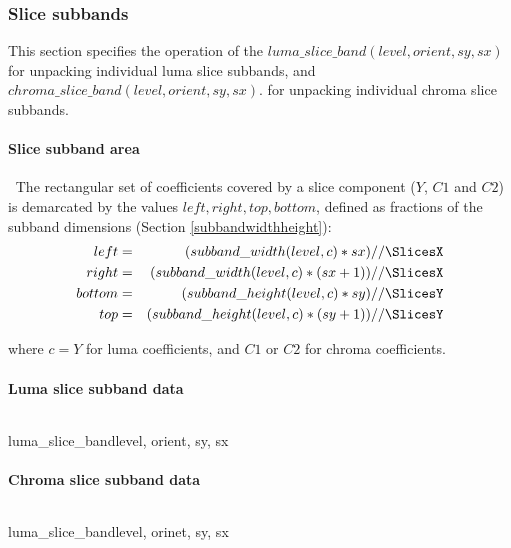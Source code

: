 \subsubsection{Slice subbands}
\label{sliceband}

This section specifies the operation of the $luma\_slice\_band( level,orient,sy,sx)$ for 
unpacking individual luma slice subbands, and $chroma\_slice\_band( level,orient,sy,sx)$. for 
unpacking individual chroma slice subbands.

\paragraph{Slice subband area}
$\ $\newline
The rectangular set of coefficients covered by a slice component ($Y$, $C1$ and $C2$) 
is demarcated by the values $left, right, top, bottom$, defined as fractions
of the subband dimensions (Section \ref{subbandwidthheight}):
\begin{eqnarray*}
  left & = & (subband\_width(level,c)*sx)//\SlicesX \\
  right & = & (subband\_width(level,c)*(sx+1))//\SlicesX \\
  bottom & = & (subband\_height(level,c)*sy)//\SlicesY \\
  top & = & (subband\_height(level,c)*(sy+1))//\SlicesY
\end{eqnarray*}

where $c=Y$ for luma coefficients, and $C1$ or $C2$ for chroma coefficients.

\paragraph{Luma slice subband data}
\label{lumasliceband}
$\ $\newline
\begin{pseudo}{luma\_slice\_band}{level, orient, sy, sx}
  \bsEND
\bsEND
\end{pseudo}

\paragraph{Chroma slice subband data}
\label{chromasliceband}
$\ $\newline
\begin{pseudo}{luma\_slice\_band}{level, orinet, sy, sx}
  \bsEND
\bsEND
\end{pseudo}

\begin{comment}
\begin{informative*}
\subsection{Data adaption and application requirements}
\label{apps}
\end{informative*}
\end{comment}